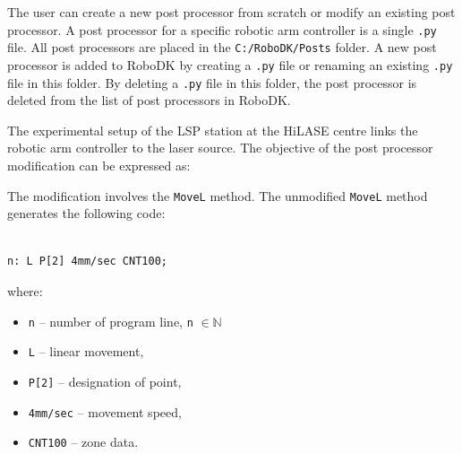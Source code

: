 The user can create a new post processor from scratch or modify an existing post processor. A post processor for a specific robotic arm controller is a single \texttt{.py} file. All post processors are placed in the \texttt{C:/RoboDK/Posts} folder. A new post processor is added to RoboDK by creating a \texttt{.py} file or renaming an existing \texttt{.py} file in this folder. By deleting a \texttt{.py} file in this folder, the post processor is deleted from the list of post processors in RoboDK. 

The experimental setup of the LSP station at the HiLASE centre links the robotic arm controller to the laser source. The objective of the post processor modification can be expressed as:



The modification involves the \texttt{MoveL} method. The unmodified \texttt{MoveL} method generates the following code:


\begin{verbatim}

n: L P[2] 4mm/sec CNT100;

\end{verbatim}


where:

\begin{itemize}

    \item \texttt{n} -- number of program line, \texttt{n} $\in \mathbb{N}$
    \item \texttt{L} -- linear movement,
    \item \texttt{P[2]} -- designation of point,
    \item \texttt{4mm/sec} -- movement speed,
    \item \texttt{CNT100} -- zone data.

\end{itemize}

